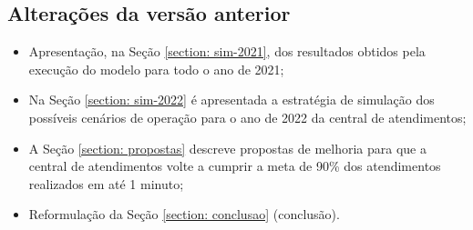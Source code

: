 \subsection{Alterações da versão anterior}
\begin{itemize}
    \item Apresentação, na Seção \ref*{section: sim-2021}, dos resultados obtidos pela execução do modelo para todo o ano de 2021;
    \item Na Seção \ref*{section: sim-2022} é apresentada a estratégia de simulação dos possíveis cenários de operação para o ano de 2022 da central de atendimentos;
    \item A Seção \ref*{section: propostas} descreve propostas de melhoria para que a central de atendimentos volte a cumprir a meta de 90\% dos atendimentos realizados em até 1 minuto;
    \item Reformulação da Seção \ref*{section: conclusao} (conclusão).
\end{itemize}
